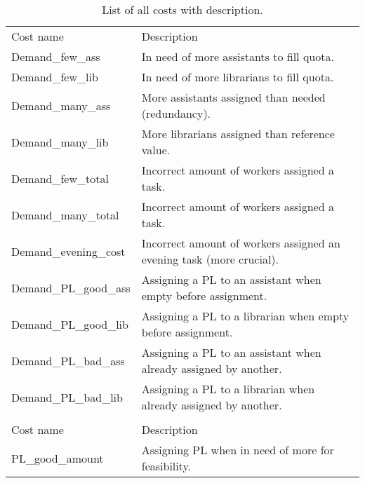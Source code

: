 \begin{table}[!h]
\centering
\caption{List of all costs with description.}
\label{tab:all_costs}
\begin{tabular}{|l|l|}
\hline
\rowcolor[HTML]{FD6864} 
\multicolumn{2}{|l|}{\cellcolor{corn} \textbf{Demand costs}} \\ \hline
\rowcolor[HTML]{C0C0C0} 
Cost name                                      & Description       \\ \hline
Demand\_few\_ass                        & In need of more assistants to fill quota.                  \\ \hline
Demand\_few\_lib                        & In need of more librarians to fill quota.                 \\ \hline
Demand\_many\_ass                       & More assistants assigned than needed (redundancy).           \\ \hline
Demand\_many\_lib                       & More librarians assigned than reference value.                  \\ \hline
Demand\_few\_total                             & Incorrect amount of workers assigned a task.                  \\ \hline
Demand\_many\_total                            & Incorrect amount of workers assigned a task.                  \\ \hline
Demand\_evening\_cost         & Incorrect amount of workers assigned an evening task (more crucial).\\ \hline
Demand\_PL\_good\_ass        & Assigning a PL to an assistant when empty before assignment.            \\ \hline
Demand\_PL\_good\_lib        & Assigning a PL to a librarian when empty before assignment.           \\ \hline
Demand\_PL\_bad\_ass         & Assigning a PL to an assistant when already assigned by another.           \\ \hline
Demand\_PL\_bad\_lib         & Assigning a PL to a librarian when already assigned by another.             \\ \hline
\rowcolor[HTML]{FD6864} 
\multicolumn{2}{|l|}{\cellcolor{corn} \textbf{PL amount costs}} \\ \hline
\rowcolor[HTML]{C0C0C0} 
Cost name                                      & Description       \\ \hline
PL\_good\_amount                  & Assigning PL when in need of more for feasibility.                  \\ \hline

\end{tabular}
\end{table}
